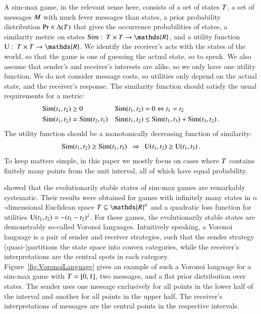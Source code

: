 A sim-max game, in the relevant sense here, consists of a set of
states $T$, a set of messages $M$ with much fever messages
than states, a prior probability distribution $\Pr \in
\Delta(T)$ that gives the occurrence probabilities of states, a
similarity metric on states $\similarity \mycolon \States \times
\States \rightarrow \mathds{R}$, and a utility function $\Utils
\mycolon \States \times \States \rightarrow \mathds{R}$. We identify
the receiver's acts with the states of the world, so that the game is
one of guessing the actual state, so to speak. We also assume that
sender's and receiver's interests are alike, so we only have one
utility function. We do not consider message costs, so utilities only
depend on the actual state, and the receiver's response. The
similarity function should satisfy the usual requirements for a
metric:
\begin{align*}
  & \mathrm{Sim}(t_{\mathrm{1}}, t_{\mathrm{2}}) \ge 0 &&
  \mathrm{Sim}(t_{\mathrm{1}}, t_{\mathrm{2}}) = 0 \Leftrightarrow
  t_{\mathrm{1}} = t_{\mathrm{2}} \\
  & \mathrm{Sim}(t_{\mathrm{1}}, t_{\mathrm{2}}) = \mathrm{Sim}(t_{\mathrm{2}},
  t_{\mathrm{1}}) && \mathrm{Sim}(t_{\mathrm{1}}, t_{\mathrm{2}}) \le
  \mathrm{Sim}(t_{\mathrm{1}}, t_{\mathrm{3}}) + \mathrm{Sim}(t_{\mathrm{3}}, t_{\mathrm{2}})\,.
\end{align*}
The utility function should be a monotonically decreasing function of
similarity:
\begin{align*}
  \similarity(\mystate{1},\mystate{2}) \ge
  \similarity(\mystate{1},\mystate{3}) \ \ \Rightarrow \ \ 
  \Utils(\mystate{1},\mystate{2}) \ge
  \Utils(\mystate{1},\mystate{3})\,.
\end{align*}
To keep matters simple, in this paper we mostly focus on cases where
$T$ contains finitely many points from the unit interval, all of
which have equal probability.

\citet{JagerMetzger2011:Voronoi-Languag} showed that the
evolutionarily stable states of sim-max games are remarkably
systematic. Their results were obtained for games with infinitely many
states in $n$-dimensional Euclidean space $\States \subseteq
\mathds{R}^n$ and a quadratic loss function for utilities
$\mathrm{U}(t_{\mathrm{1}}, t_{\mathrm{2}}) = - (t_{\mathrm{1}} -
t_{\mathrm{2}})^2$. For these games, the evolutionarily stable states are
demonstrably so-called Voronoi languages. Intuitively speaking, a
Voronoi language is a pair of sender and receiver strategies, such
that the sender strategy (quasi-)partitions the state space into
convex categories, while the receiver's interpretations are the
central spots in each category. Figure~\ref{fig:VoronoiLanguage} gives
an example of such a Voronoi language for a sim-max game with $T
= [0,1]$, two messages, and a flat prior distribution over states. The
sender uses one message exclusively for all points in the lower half
of the interval and another for all points in the upper half. The
receiver's interpretations of messages are the central points in the
respective intervals.

